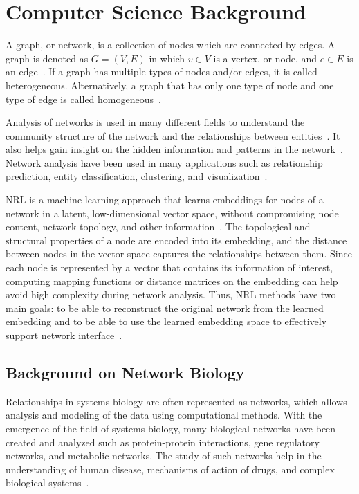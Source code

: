 \chapter{Computer Science Background}
\label{ch:computerscience}

A graph, or network, is a collection of nodes which are connected by edges.
A graph is denoted as $G=(V,E)$ in which $v \in V$ is a vertex, or node, and $e \in E$ is an edge~\cite{cai_comprehensive_2017}.
If a graph has multiple types of nodes and/or edges, it is called heterogeneous.
Alternatively, a graph that has only one type of node and one type of edge is called homogeneous~\cite{cai_comprehensive_2017}.

Analysis of networks is used in many different fields to understand the community structure of the network and the relationships between entities~\cite{cai_comprehensive_2017}.
It also helps gain insight on the hidden information and patterns in the network~\cite{cai_comprehensive_2017}.
Network analysis have been used in many applications such as relationship prediction, entity classification, clustering, and visualization~\cite{goyal_graph_2018}.

\ac{NRL} is a machine learning approach that learns embeddings for nodes of a network in a latent, low-dimensional vector space, without compromising node content, network topology, and other information~\cite{zhang_network_2017}.
The topological and structural properties of a node are encoded into its embedding, and the distance between nodes in the vector space captures the relationships between them.
Since each node is represented by a vector that contains its information of interest, computing mapping functions or distance matrices on the embedding can help avoid high complexity during network analysis.
Thus, \ac{NRL} methods have two main goals: to be able to reconstruct the original network from the learned embedding and to be able to use the learned embedding space to effectively support network interface~\cite{sheikh_gat2vec:_2018}.

\section{Background on Network Biology}

Relationships in systems biology are often represented as networks, which allows analysis and modeling of the data using computational methods.
With the emergence of the field of systems biology, many biological networks have been created and analyzed such as protein-protein interactions, gene regulatory networks, and metabolic networks.
The study of such networks help in the understanding of human disease, mechanisms of action of drugs, and complex biological systems~\cite{dancik_properties_2013}.

